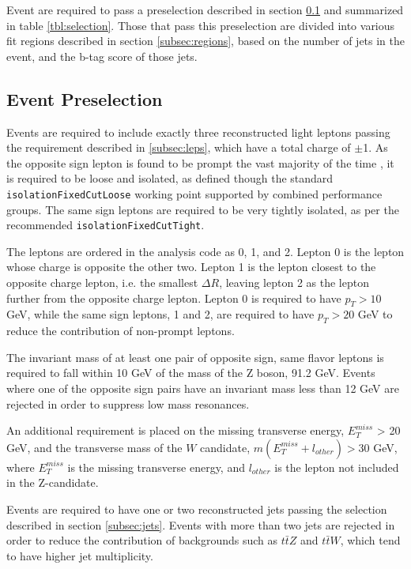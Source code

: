 
Event are required to pass a preselection described in section \ref{subsec:presel} and summarized in table \ref{tbl:selection}. Those that pass this preselection are divided into various fit regions described in section \ref{subsec:regions}, based on the number of jets in the event, and the b-tag score of those jets.

\subsection{Event Preselection}
\label{subsec:presel}

Events are required to include exactly three reconstructed light leptons passing the requirement described in \ref{subsec:leps}, which have a total charge of $\pm$1. As the opposite sign lepton is found to be prompt the vast majority of the time \cite{ttH_paper}, it is required to be loose and isolated, as defined though the standard \verb|isolationFixedCutLoose| working point supported by combined performance groups. The same sign leptons are required to be very tightly isolated, as per the recommended \verb|isolationFixedCutTight|.

The leptons are ordered in the analysis code as 0, 1, and 2. Lepton 0 is the lepton whose charge is opposite the other two. Lepton 1 is the lepton closest to the opposite charge lepton, i.e. the smallest $\Delta R$, leaving lepton 2 as the lepton further from the opposite charge lepton. Lepton 0 is required to have $p_T > 10$ GeV, while the same sign leptons, 1 and 2, are required to have $p_T > 20$ GeV to reduce the contribution of non-prompt leptons.  

The invariant mass of at least one pair of opposite sign, same flavor leptons is required to fall within 10 GeV of the mass of the Z boson, 91.2 GeV. Events where one of the opposite sign pairs have an invariant mass less than 12 GeV are rejected in order to suppress low mass resonances. %

An additional requirement is placed on the missing transverse energy, $E^{miss}_T$ > 20 GeV, and the transverse mass of the $W$ candidate, $m(E^{miss}_T + l_{other}) > 30$ GeV, where $E^{miss}_T$ is the missing transverse energy, and $l_{other}$ is the lepton not included in the Z-candidate. 

Events are required to have one or two reconstructed jets passing the selection described in section \ref{subsec:jets}. Events with more than two jets are rejected in order to reduce the contribution of backgrounds such as $t\bar{t}Z$ and $t\bar{t}W$, which tend to have higher jet multiplicity. 

